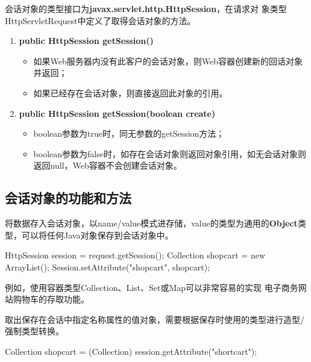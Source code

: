 会话对象的类型接口为{\bf\Blue javax.servlet.http.HttpSession}，在请求对
象类型HttpServletRequest中定义了取得会话对象的方法。

\begin{enumerate}
\item {\bf public HttpSession getSession()}
  \begin{itemize}
  \item 如果Web服务器内没有此客户的会话对象，则Web容器创建新的回话对象并返回；
  \item 如果已经存在会话对象，则直接返回此对象的引用。
  \end{itemize}

\item {\bf public HttpSession getSession(boolean create)}
  \begin{itemize}
  \item boolean参数为true时，同无参数的getSession方法；
  \item boolean参数为false时，如存在会话对象则返回对象引用，如无会话对象则返回null，Web容器不会创建会话对象。
  \end{itemize}
\end{enumerate}

\subsection{会话对象的功能和方法} 


将数据存入会话对象，以name/value模式进存储，value的类型为通用的{\bf Object}类型，可以将任何Java对象保存到会话对象中。


\begin{javaCode}
  HttpSession session = request.getSession();
  Collection shopcart = new ArrayList();
  Session.setAttribute("shopcart", shopcart);
\end{javaCode}

{\kai\Blue 例如，使用容器类型Collection、List、Set或Map可以非常容易的实现
  电子商务网站购物车的存取功能。}


取出保存在会话中指定名称属性的值对象，需要根据保存时使用的类型进行{\hei\Blue 造型/强制类型转换}。

\begin{javaCode}
  Collection shopcart = (Collection) session.getAttribute("shortcart");
\end{javaCode}

